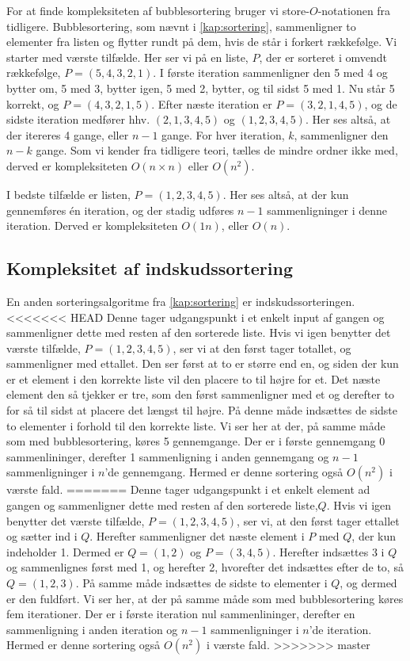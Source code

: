 For at finde kompleksiteten af bubblesortering bruger vi store-$O$-notationen fra tidligere. 
Bubblesortering, som nævnt i \autoref{kap:sortering}, sammenligner to elementer fra listen og flytter rundt på dem, hvis de står i forkert rækkefølge.
Vi starter med værste tilfælde. Her ser vi på en liste, $P$, der er sorteret i omvendt rækkefølge, $P = (5,4,3,2,1)$.
I første iteration sammenligner den 5 med 4 og bytter om, 5 med 3, bytter igen, 5 med 2, bytter, og til sidst 5 med 1. Nu står 5 korrekt, og $P = (4, 3, 2, 1, 5)$.
Efter næste iteration er $P = (3, 2, 1, 4, 5)$, og de sidste iteration medfører hhv. $(2, 1, 3, 4, 5)$ og $(1, 2, 3, 4, 5)$. Her ses altså, at der itereres 4 gange, eller $n-1$ gange. 
For hver iteration, $k$, sammenligner den $n-k$ gange. 
Som vi kender fra tidligere teori, tælles de mindre ordner ikke med, derved er kompleksiteten $O(n\times n)$ eller $O(n^2)$.

I bedste tilfælde er listen, $P = (1, 2, 3, 4, 5)$.
Her ses altså, at der kun gennemføres én iteration, og der stadig udføres $n-1$ sammenligninger i denne iteration. Derved er kompleksiteten $O(1n)$, eller $O(n)$. 

\subsection{Kompleksitet af indskudssortering} \label{kap:kom_indskud}
En anden sorteringsalgoritme fra \autoref{kap:sortering} er indskudssorteringen. 
<<<<<<< HEAD
Denne tager udgangspunkt i et enkelt input af gangen og sammenligner dette med resten af den sorterede liste.
Hvis vi igen benytter det værste tilfælde, $P = (1,2,3,4,5)$, ser vi at den først tager totallet, og sammenligner med ettallet. Den ser først at to er større end en, og siden der kun er et element i den korrekte liste vil den placere to til højre for et. Det næste element den så tjekker er tre, som den først sammenligner med et og derefter to for så til sidst at placere det længst til højre. På denne måde indsættes de sidste to elementer i forhold til den korrekte liste.
Vi ser her at der, på samme måde som med bubblesortering, køres 5 gennemgange. Der er i første gennemgang 0 sammenlininger, derefter 1 sammenligning i anden gennemgang og $n-1$ sammenligninger i $n$'de gennemgang. Hermed er denne sortering også $O(n^2)$ i værste fald.
=======
Denne tager udgangspunkt i et enkelt element ad gangen og sammenligner dette med resten af den sorterede liste,$Q$.
Hvis vi igen benytter det værste tilfælde, $P = (1,2,3,4,5)$, ser vi, at den først tager ettallet og sætter ind i $Q$. Herefter sammenligner det næste element i $P$ med $Q$, der kun indeholder 1. Dermed er $Q=(1,2)$ og $P=(3,4,5)$. 
Herefter indsættes 3 i $Q$ og sammenlignes først med 1, og herefter 2, hvorefter det indsættes efter de to, så $Q = (1,2,3)$. På samme måde indsættes de sidste to elementer i $Q$, og dermed er den fuldført.
Vi ser her, at der på samme måde som med bubblesortering køres fem iterationer. Der er i første iteration nul sammenlininger, derefter en sammenligning i anden iteration og $n-1$ sammenligninger i $n$'de iteration. Hermed er denne sortering også $O(n^2)$ i værste fald.
>>>>>>> master

